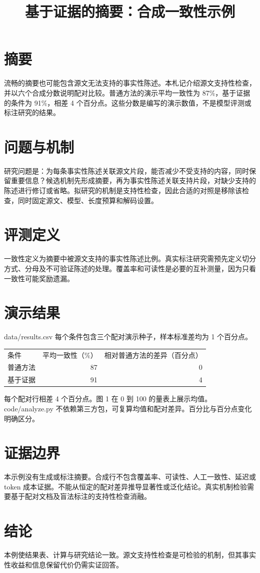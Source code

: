 \documentclass[UTF8]{ctexart}
\title{基于证据的摘要：合成一致性示例}
\author{}
\date{}
\begin{document}
\maketitle

\section*{摘要}

流畅的摘要也可能包含源文无法支持的事实性陈述。本札记介绍源文支持性检查，并以六个合成分数说明配对比较。普通方法的演示平均一致性为 87\%，基于证据的条件为 91\%，相差 4 个百分点。这些分数是编写的演示数值，不是模型评测或标注研究的结果。

\section*{问题与机制}

研究问题是：为每条事实性陈述关联源文片段，能否减少不受支持的内容，同时保留重要信息？候选机制先形成摘要，再为事实性陈述关联支持片段，对缺少支持的陈述进行修订或省略。拟研究的机制是支持性检查，因此合适的对照是移除该检查，同时固定源文、模型、长度预算和解码设置。

\section*{评测定义}

一致性定义为摘要中被源文支持的事实性陈述比例。真实标注研究需预先定义切分方式、分母及不可验证陈述的处理。覆盖率和可读性是必要的互补测量，因为只看一致性可能奖励遗漏。

\section*{演示结果}

data/results.csv 每个条件包含三个配对演示种子，样本标准差均为 1 个百分点。

\begin{center}\begin{tabular}{lrr}\hline
条件 & 平均一致性（\%） & 相对普通方法的差异（百分点） \\
普通方法 & 87 & 0 \\
基于证据 & 91 & 4 \\
\hline\end{tabular}\end{center}

每个配对行相差 4 个百分点。图 1 在 0 到 100 的量表上展示均值。code/analyze.py 不依赖第三方包，可复算均值和配对差异。百分比与百分点变化明确区分。

\section*{证据边界}

本示例没有生成或标注摘要。合成行不包含覆盖率、可读性、人工一致性、延迟或 token 成本证据。不能从恒定的配对差异推导显著性或泛化结论。真实机制检验需要基于配对文档及盲法标注的支持性检查消融。

\section*{结论}

本例使结果表、计算与研究结论一致。源文支持性检查是可检验的机制，但其事实性收益和信息保留代价仍需实证回答。
\end{document}
